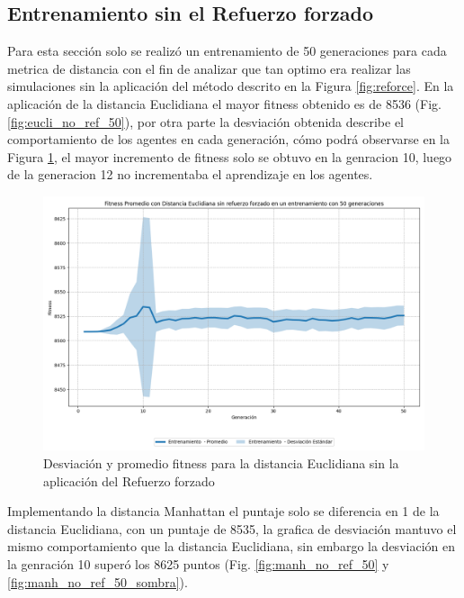 \documentclass[lettersize, journal]{IEEEtran}
\begin{document}
\subsection{Entrenamiento sin el Refuerzo forzado}
Para esta sección solo se realizó un entrenamiento de 50 generaciones para cada metrica de distancia con el fin de analizar que tan optimo era realizar las simulaciones sin la aplicación del método descrito en la Figura \ref{fig:reforce}.
En la aplicación de la distancia Euclidiana el mayor fitness obtenido es de 8536 (Fig. \ref{fig:eucli_no_ref_50}), por otra parte la desviación obtenida describe el comportamiento de los agentes en cada generación, cómo podrá observarse en la Figura \ref{fig:no_refoice_eucli_desv}, el mayor incremento de fitness solo se obtuvo en la genracion 10, luego de la generacion 12 no incrementaba el aprendizaje en los agentes.
\begin{figure}[H]
    \centering
    \includegraphics[width=0.8\linewidth]{Sin_Refuerzo_50Gen/Eucli_NoRef_50Gen_Sombra.png}
    \caption{Desviación y promedio fitness para la distancia Euclidiana sin la aplicación del Refuerzo forzado}
    \label{fig:no_refoice_eucli_desv}
\end{figure}

Implementando la distancia Manhattan el puntaje solo se diferencia en 1 de la distancia Euclidiana, con un puntaje de 8535, la grafica de desviación mantuvo el mismo comportamiento que la distancia Euclidiana, sin embargo la desviación en la genración 10 superó los 8625 puntos (Fig. \ref{fig:manh_no_ref_50} y \ref{fig:manh_no_ref_50_sombra}).
\end{document}
